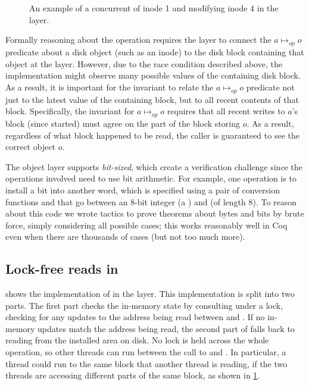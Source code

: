 \begin{figure}[ht]
\centering

\caption{An example of a concurrent  of inode 1 and 
  modifying inode 4
  in the  layer.}
\label{fig:txn-concur}
\end{figure}

Formally reasoning about the  operation requires the 
layer to connect the $a \mapsto_{\mathit{op}} o$ predicate about a disk object
(such as an inode) to the disk block containing that object at the
 layer.  However, due to the race condition described above,
the  implementation might observe many possible values of the
containing disk block.  As a result, it is important for the 
invariant to relate the $a \mapsto_{\mathit{op}} o$ predicate not just to
the latest value of the containing block, but to all recent contents
of that block.  Specifically, the invariant for $a \mapsto_{\mathit{op}} o$
requires that all recent writes to $a$'s block (since 
started) must agree on the part of the block storing $o$.  As a result,
regardless of what block happened to be read,
the caller is guaranteed to see the correct object $o$.

The object layer supports \emph{bit-sized}, which create a verification
challenge since the operations involved need to use bit arithmetic. For example,
one operation is to install a bit into another word, which is specified using a
pair of conversion functions  and  that go
between an 8-bit integer (a ) and  (of length 8). To reason
about this code we wrote tactics to prove theorems about bytes and bits by brute
force, simply considering all possible cases; this works reasonably well in Coq
even when there are thousands of cases (but not too much more).

\subsection[Lock-free reads in WAL]{Lock-free reads in }
\label{sec:txn:wal-read}

 shows the implementation of  in the
 layer.  This implementation is split into two parts. The first part checks
the in-memory state by consulting  under a lock, checking for any
updates to the address being read between  and . If
no in-memory updates match the address being read, the second part of  falls back
to reading from the installed area on disk.  No lock is held across the whole
operation, so other threads
can run between the call to  and .
In particular, a thread could run 
to the same block that another thread is reading, if the two threads
are accessing different parts of the same block, as shown in \cref{fig:txn-concur}.

